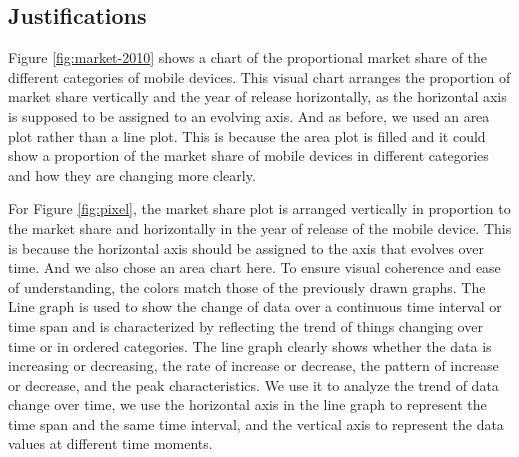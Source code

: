 \documentclass[conference]{IEEEtran}
\begin{document}
\subsection{Justifications}
Figure \ref{fig:market-2010} shows a chart of the proportional market share of the different categories of mobile devices. This visual chart arranges the proportion of market share vertically and the year of release horizontally, as the horizontal axis is supposed to be assigned to an evolving axis. And as before, we used an area plot rather than a line plot. This is because the area plot is filled and it could show a proportion of the market share of mobile devices in different categories and how they are changing more clearly. 

For Figure \ref{fig:pixel}, the market share plot is arranged vertically in proportion to the market share and horizontally in the year of release of the mobile device. This is because the horizontal axis should be assigned to the axis that evolves over time. And we also chose an area chart here. To ensure visual coherence and ease of understanding, the colors match those of the previously drawn graphs. The Line graph is used to show the change of data over a continuous time interval or time span and is characterized by reflecting the trend of things changing over time or in ordered categories. The line graph clearly shows whether the data is increasing or decreasing, the rate of increase or decrease, the pattern of increase or decrease, and the peak characteristics. We use it to analyze the trend of data change over time, we use the horizontal axis in the line graph to represent the time span and the same time interval, and the vertical axis to represent the data values at different time moments.



\end{document}
